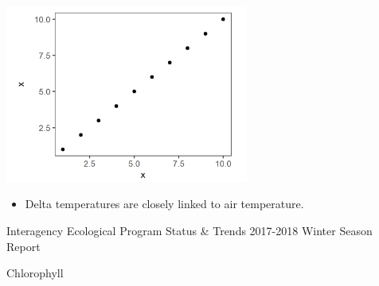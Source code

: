 \documentclass[]{article}\usepackage[]{graphicx}\usepackage[]{color}
\begin{document}
\begin{Row}
  \begin{Cell}{4}
    \begin{center}
      \includegraphics[width=8cm,align=m]{figures/temperature/placeholder_fig.png}
      \vspace{0.5cm}
      \begin{itemize}[leftmargin=1.5cm,rightmargin=1cm]
        \item Delta temperatures are closely linked to air temperature.
      \end{itemize}
    \end{center}
  \end{Cell}
\end{Row}


\newpage


\hypertarget{page:chlorophyll}{}
\begin{Row}
  \begin{Cell}{1}
    \begin{center}
      {\Large Interagency Ecological Program Status \& Trends 2017-2018 Winter Season Report}
    \end{center}
  \end{Cell}
\end{Row}

\begin{Row}
  \begin{Cell}{1}
    \begin{center}
      {\Huge Chlorophyll}
    \end{center}
  \end{Cell}
\end{Row}
\end{document}
